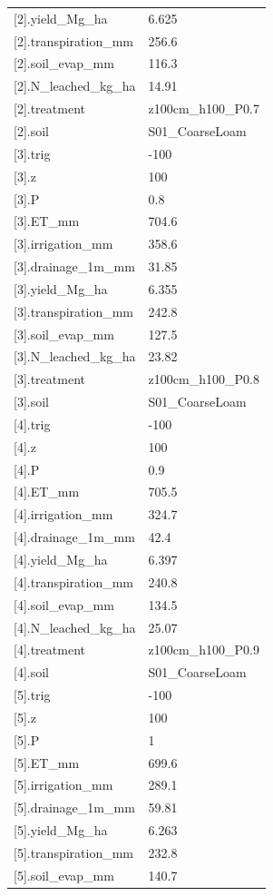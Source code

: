 {\begin{longtable}{p{}p{}}
{}[2].yield\_Mg\_ha & 6.625\\
{}[2].transpiration\_mm & 256.6\\
{}[2].soil\_evap\_mm & 116.3\\
{}[2].N\_leached\_kg\_ha & 14.91\\
{}[2].treatment & z100cm\_h100\_P0.7\\
{}[2].soil & S01\_CoarseLoam\\
{}[3].trig & -100\\
{}[3].z & 100\\
{}[3].P & 0.8\\
{}[3].ET\_mm & 704.6\\
{}[3].irrigation\_mm & 358.6\\
{}[3].drainage\_1m\_mm & 31.85\\
{}[3].yield\_Mg\_ha & 6.355\\
{}[3].transpiration\_mm & 242.8\\
{}[3].soil\_evap\_mm & 127.5\\
{}[3].N\_leached\_kg\_ha & 23.82\\
{}[3].treatment & z100cm\_h100\_P0.8\\
{}[3].soil & S01\_CoarseLoam\\
{}[4].trig & -100\\
{}[4].z & 100\\
{}[4].P & 0.9\\
{}[4].ET\_mm & 705.5\\
{}[4].irrigation\_mm & 324.7\\
{}[4].drainage\_1m\_mm & 42.4\\
{}[4].yield\_Mg\_ha & 6.397\\
{}[4].transpiration\_mm & 240.8\\
{}[4].soil\_evap\_mm & 134.5\\
{}[4].N\_leached\_kg\_ha & 25.07\\
{}[4].treatment & z100cm\_h100\_P0.9\\
{}[4].soil & S01\_CoarseLoam\\
{}[5].trig & -100\\
{}[5].z & 100\\
{}[5].P & 1\\
{}[5].ET\_mm & 699.6\\
{}[5].irrigation\_mm & 289.1\\
{}[5].drainage\_1m\_mm & 59.81\\
{}[5].yield\_Mg\_ha & 6.263\\
{}[5].transpiration\_mm & 232.8\\
{}[5].soil\_evap\_mm & 140.7\\

\end{longtable}}
